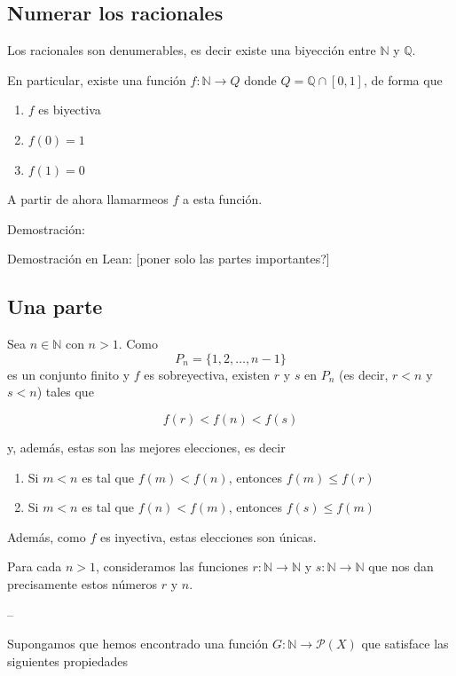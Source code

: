 \documentclass{article}
\newcommand{\nat}{\mathbb{N}}
\newcommand{\rat}{\mathbb{Q}}
\begin{document}
\subsection{Numerar los racionales}

Los racionales son denumerables, es decir existe una biyección entre $\nat$ y $\rat$.

En particular, existe una función $f : \nat \to Q$ donde $Q = \rat \cap [0, 1]$, de forma que

\begin{enumerate}
  \item $f$ es biyectiva
  \item $f(0) = 1$
  \item $f(1) = 0$
\end{enumerate}

A partir de ahora llamarmeos $f$ a esta función.

Demostración:

Demostración en Lean: [poner solo las partes importantes?]

\subsection{Una parte}

Sea $n \in \nat$ con $n > 1$. Como $$P_n = \{1, 2, \dots, n-1\}$$ es un conjunto finito y $f$ es sobreyectiva, existen $r$ y $s$ en $P_n$ (es decir, $r < n$ y $s < n$) tales que

\begin{equation} \label{cond_rs}
  f(r) < f(n) < f(s)
\end{equation}

y, además, estas son las mejores elecciones, es decir

\begin{enumerate}
  \item Si $m < n$ es tal que $f(m) < f(n)$, entonces $f(m) \leq f(r)$
  \item Si $m < n$ es tal que $f(n) < f(m)$, entonces $f(s) \leq f(m)$
\end{enumerate}

Además, como $f$ es inyectiva, estas elecciones son únicas.

Para cada $n > 1$, consideramos las funciones $r : \nat \to \nat$ y $s : \nat \to \nat$ que nos dan precisamente estos números $r$ y $n$.

--

Supongamos que hemos encontrado una función $G : \nat \to \mathcal{P}(X)$ que satisface las siguientes propiedades
\end{document}
